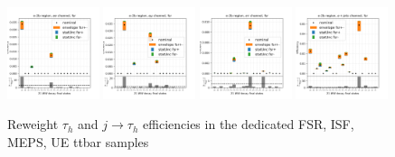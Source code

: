 \begin{figure}
    \includegraphics[width=0.24\textwidth]{chapters/Appendix/sectionTTSyst/figures/afterCorr/icata3_ch0_fsr.png}
    \includegraphics[width=0.24\textwidth]{chapters/Appendix/sectionTTSyst/figures/afterCorr/icata3_ch1_fsr.png}
    \includegraphics[width=0.24\textwidth]{chapters/Appendix/sectionTTSyst/figures/afterCorr/icata3_ch2_fsr.png}
    \includegraphics[width=0.24\textwidth]{chapters/Appendix/sectionTTSyst/figures/afterCorr/icata3_ch3_fsr.png}
    
    \caption{Reweight $\tau_h$ and $j \to \tau_h$ efficiencies in the dedicated FSR, ISF, MEPS, UE ttbar samples}
    \label{fig:appendix:reweighttt:effAfterCorrFSR}
\end{figure}



